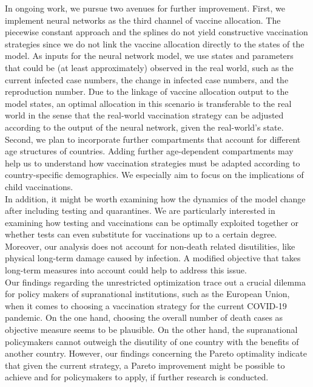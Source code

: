 In ongoing work, we pursue two avenues for further improvement. First, we implement neural networks as the third channel of vaccine allocation. The piecewise constant approach and the splines do not yield constructive vaccination strategies since we do not link the vaccine allocation directly to the states of the model. As inputs for the neural network model, we use states and parameters that could be (at least approximately) observed in the real world, such as the current infected case numbers, the change in infected case numbers, and the reproduction number. Due to the linkage of vaccine allocation output to the model states, an optimal allocation in this scenario is transferable to the real world in the sense that the real-world vaccination strategy can be adjusted according to the output of the neural network, given the real-world's state. Second, we plan to incorporate further compartments that account for different age structures of countries. Adding further age-dependent compartments may help us to understand how vaccination strategies must be adapted according to country-specific demographics. We especially aim to focus on the implications of child vaccinations.  \\




In addition, it might be worth examining how the dynamics of the model change after including testing and quarantines. We are particularly interested in examining how testing and vaccinations can be optimally exploited together or whether tests can even substitute for vaccinations up to a certain degree. Moreover, our analysis does not account for non-death related disutilities, like physical long-term damage caused by infection. A modified objective that takes long-term measures into account could help to address this issue. \\




Our findings regarding the unrestricted optimization trace out a crucial dilemma for policy makers of supranational institutions, such as the European Union, when it comes to choosing a vaccination strategy for the current COVID-19 pandemic. On the one hand, choosing the overall number of death cases as objective measure seems to be plausible. On the other hand, the supranational policymakers cannot outweigh the disutility of one country with the benefits of another country. However, our findings concerning the Pareto optimality indicate that given the current strategy, a Pareto improvement might be possible to achieve and for policymakers to apply, if further research is conducted.


